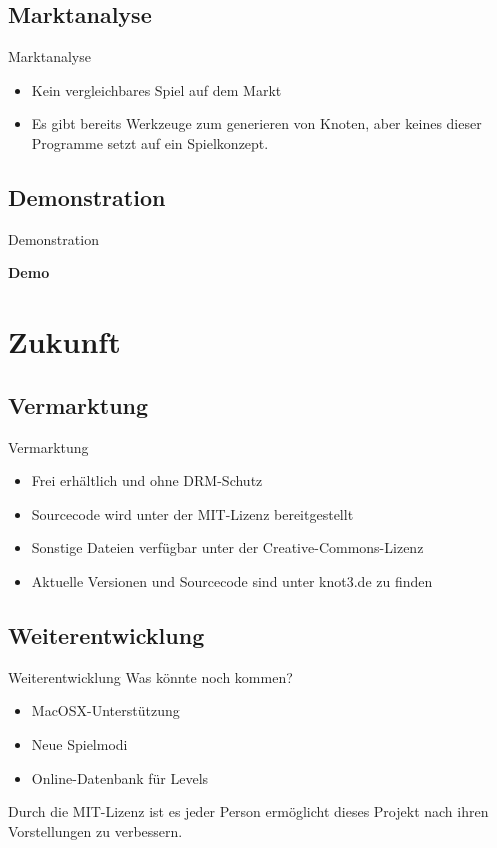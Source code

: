 \documentclass[18pt]{beamer}
\begin{document}
\subsection{Marktanalyse}
\begin{frame}{Marktanalyse}

\begin{itemize}
\item Kein vergleichbares Spiel auf dem Markt
\item Es gibt bereits Werkzeuge zum generieren von Knoten, aber keines dieser Programme setzt auf ein Spielkonzept.

\end{itemize}
\end{frame}

\subsection{Demonstration}
\begin{frame}{Demonstration}
\begin{center}
\Huge \textbf{Demo}
\end{center}

\end{frame}





\section{Zukunft}
\subsection{Vermarktung}
\begin{frame}{Vermarktung}
\begin{itemize}
\item Frei erhältlich und ohne DRM-Schutz
\item Sourcecode wird unter der MIT-Lizenz bereitgestellt
\item Sonstige Dateien verfügbar unter der Creative-Commons-Lizenz
\item Aktuelle Versionen und Sourcecode sind unter knot3.de zu finden

\end{itemize}
\end{frame}

\subsection{Weiterentwicklung}
\begin{frame}{Weiterentwicklung}
Was könnte noch kommen?
\begin{itemize}
\item MacOSX-Unterstützung 
\item Neue Spielmodi
\item Online-Datenbank für Levels
\end{itemize}

Durch die MIT-Lizenz ist es jeder Person ermöglicht dieses Projekt nach ihren Vorstellungen zu verbessern.
\end{frame}
\end{document}
